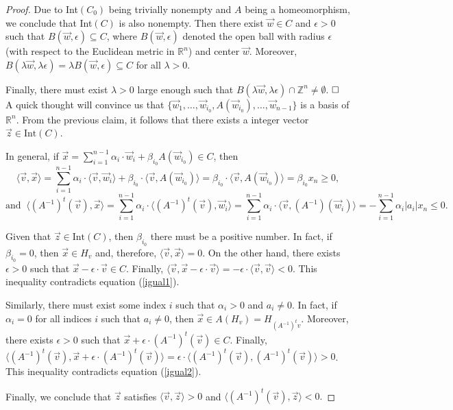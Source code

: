 \documentclass[10pt,a4paper]{amsart}
\begin{document}
\begin{proof}
    Due to Int$(C_0)$ being trivially nonempty and $A$ being a homeomorphism, we conclude that Int$(C)$ is also nonempty. Then there exist $\vec{w}\in C$ and $\epsilon>0$ such that $B(\vec{w},\epsilon)\subseteq C$, where $B(\vec{w},\epsilon)$ denoted the open ball with radius $\epsilon$ (with respect to the Euclidean metric in $\mathbb{R}^n$) and center $\vec{w}$. Moreover, $B(\lambda\vec{w},\lambda\epsilon)=\lambda B(\vec{w},\epsilon)\subseteq C$ for all $\lambda>0$.
    
    Finally, there must exist $\lambda>0$ large enough such that $B(\lambda\vec{w},\lambda\epsilon)\cap \mathbb{Z}^n\neq \emptyset$. $\hfill\square$\\

A quick thought will convince us that $\{\vec{w}_1,\dots, \vec{w}_{i_0},A(\vec{w}_{i_0}),\dots, \vec{w}_{n-1}\}$ is a basis of $\mathbb{R}^n$. From the previous claim, it follows that there exists a integer vector $\vec{z}\in \text{Int}(C)$.

In general, if $\vec{x}=\sum_{i=1}^{n-1}\alpha_i\cdot\vec{w}_i  + \beta_{i_0}A(\vec{w}_{i_0})\in C$, then
\begin{equation}   
\label{igual1}
\langle\vec{v},\vec{x}\rangle=\sum_{i=1}^{n-1}\alpha_{i}\cdot\langle\vec{v},\vec{w}_i \rangle + \beta_{i_0}\cdot \langle \vec{v},A(\vec{w}_{i_0})\rangle=\beta_{i_0}\cdot \langle \vec{v},A(\vec{w}_{i_0})\rangle=\beta_{i_0}x_n\geq 0,
\end{equation}
\begin{equation}
\label{igual2}
\text{and }\ \langle (A^{-1})^t(\vec{v}),\vec{x}\rangle=\sum_{i=1}^{n-1}\alpha_i\cdot\langle (A^{-1})^t(\vec{v}),\vec{w}_i\rangle=\sum_{i=1}^{n-1}\alpha_i\cdot\langle \vec{v},(A^{-1})(\vec{w}_i)\rangle=-\sum_{i=1}^{n-1}\alpha_i|a_{i}|x_n\leq 0.    
\end{equation}

Given that $\vec{z}\in \text{Int}(C)$, then $\beta_{i_0}$ there must be a positive number. In fact, if $\beta_{i_0}=0$, then $\vec{x}\in H_v$ and, therefore,  $\langle\vec{v},\vec{x}\rangle=0$. On the other hand, there exists $\epsilon>0$ such that $\vec{x}-\epsilon\cdot\vec{v}\in C$. Finally, $\langle\vec{v},\vec{x}-\epsilon\cdot\vec{v}\rangle=-\epsilon\cdot\langle\vec{v},\vec{v}\rangle<0$. This inequality contradicts equation (\ref{igual1}).

Similarly, there must exist some index $i$ such that $\alpha_i> 0$ and $a_i\neq 0$. In fact, if $\alpha_i=0$ for all indices $i$ such that $a_i\neq 0$, then $\vec{x}\in A(H_v)=H_{(A^{-1})^tv}$. Moreover, there exists $\epsilon>0$ such that $\vec{x}+\epsilon\cdot(A^{-1})^t(\vec{v})\in C$. Finally, $\langle (A^{-1})^t(\vec{v}), \vec{x}+ \epsilon\cdot(A^{-1})^t(\vec{v})\rangle=\epsilon\cdot\langle (A^{-1})^t(\vec{v}), (A^{-1})^t(\vec{v})\rangle>0$. This inequality contradicts equation (\ref{igual2}).

Finally, we conclude that $\vec{z}$ satisfies $\langle\vec{v},\vec{z}\rangle>0$ and $\langle(A^{-1})^t(\vec{v}),\vec{z}\rangle<0.$ 
\end{proof}
\end{document}
